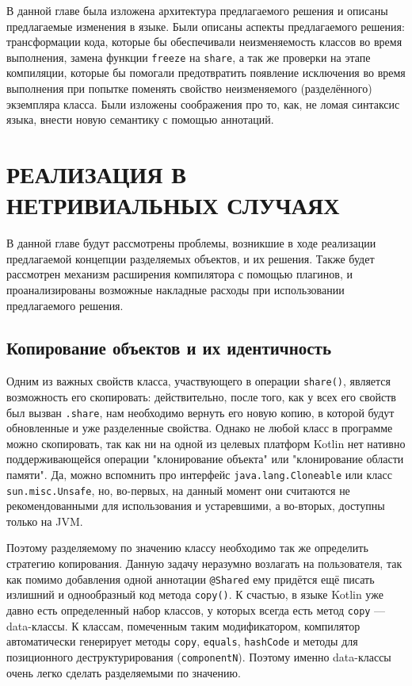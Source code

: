 \documentclass[specification,annotation,times]{itmo-student-thesis}
\newcommand{\todo}[1]{\textbf{TODO}} %
\begin{document}
В данной главе была изложена архитектура предлагаемого решения и описаны предлагаемые изменения в языке.
Были описаны аспекты предлагаемого решения: трансформации кода, которые бы обеспечивали неизменяемость классов во время выполнения, замена функции \texttt{freeze} на \texttt{share}, а так же проверки на этапе компиляции, которые бы помогали предотвратить появление исключения во время выполнения при попытке поменять свойство неизменяемого (разделённого) экземпляра класса.
Были изложены соображения про то, как, не ломая синтаксис языка, внести новую семантику с помощью аннотаций.

\chapter{РЕАЛИЗАЦИЯ В НЕТРИВИАЛЬНЫХ СЛУЧАЯХ}

В данной главе будут рассмотрены проблемы, возникшие в ходе реализации предлагаемой концепции разделяемых объектов, и их решения.
Также будет рассмотрен механизм расширения компилятора с помощью плагинов, и проанализированы возможные накладные расходы при использовании предлагаемого решения.



\section{Копирование объектов и их идентичность}

Одним из важных свойств класса, участвующего в операции \texttt{share()}, является возможность его скопировать: действительно, после того, как у всех его свойств был вызван \texttt{.share}, нам необходимо вернуть его новую копию, в которой будут обновленные и уже разделенные свойства.
Однако не любой класс в программе можно скопировать, так как ни на одной из целевых платформ Kotlin нет нативно поддерживающейся операции "клонирование объекта" или "клонирование области памяти". Да, можно вспомнить про интерфейс \texttt{java.lang.Cloneable} или класс \texttt{sun.misc.Unsafe}, но, во-первых, на данный момент они считаются не рекомендованными для использования и устаревшими, а во-вторых, доступны только на JVM.

Поэтому разделяемому по значению классу необходимо так же определить стратегию копирования. Данную задачу неразумно возлагать на пользователя, так как помимо добавления одной аннотации \texttt{@Shared} ему придётся ещё писать излишний и однообразный код метода \texttt{copy()}.
К счастью, в языке Kotlin уже давно есть определенный набор классов, у которых всегда есть метод \texttt{copy} --- data-классы. К классам, помеченным таким модификатором, компилятор автоматически генерирует методы \texttt{copy}, \texttt{equals}, \texttt{hashCode} и методы для позиционного деструктурирования (\texttt{componentN}).
Поэтому именно data-классы очень легко сделать разделяемыми по значению.
\end{document}
